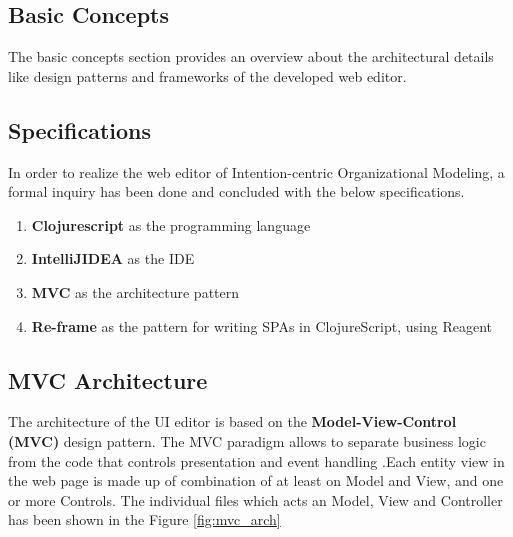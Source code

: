 \subsection{Basic Concepts}
\label{subsec:basicconcepts}
\hspace{4ex} The basic concepts section provides an overview about the architectural details like design patterns and frameworks of the developed web editor.


\subsection{Specifications}
\label{subsec:specifications}
In order to realize the web editor of Intention-centric Organizational Modeling, a formal inquiry has been done and concluded with the below specifications.

\begin{enumerate}   
	\item \textbf{Clojurescript} as the programming language
	\item \textbf{IntelliJIDEA} as the IDE
	\item \textbf{MVC} as the architecture pattern
	\item \textbf{Re-frame} as the pattern for writing SPAs in ClojureScript, using Reagent	
\end{enumerate}

\subsection{MVC Architecture}
\label{subsec:mvcarch}
\hspace{4ex} The architecture of the UI editor is based on the \textbf{Model-View-Control (MVC)} design pattern. The MVC paradigm allows to separate business logic from the code that controls presentation and event handling \cite{Oracle2016}.Each entity view in the web page is made up of combination of at least on Model and View, and one or more Controls. The individual files which acts an Model, View and Controller has been shown in the Figure \ref{fig:mvc_arch}

